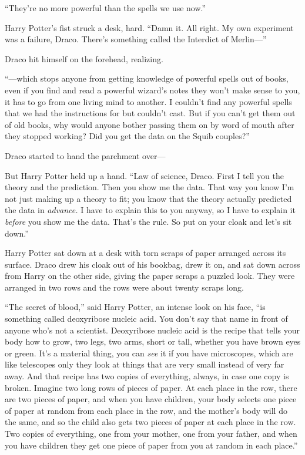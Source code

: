 ``They're no more powerful than the spells we use now.''

Harry Potter's fist struck a desk, hard. ``Damn it. All right. My own
experiment was a failure, Draco. There's something called the Interdict
of Merlin---''

Draco hit himself on the forehead, realizing.

``---which stops anyone from getting knowledge of powerful spells out of
books, even if you find and read a powerful wizard's notes they won't
make sense to you, it has to go from one living mind to another. I
couldn't find any powerful spells that we had the instructions for but
couldn't cast. But if you can't get them out of old books, why would
anyone bother passing them on by word of mouth after they stopped
working? Did you get the data on the Squib couples?''

Draco started to hand the parchment over---

But Harry Potter held up a hand. ``Law of science, Draco. First I tell
you the theory and the prediction. Then you show me the data. That way
you know I'm not just making up a theory to fit; you know that the
theory actually predicted the data in \emph{advance.} I have to explain
this to you anyway, so I have to explain it \emph{before} you show me
the data. That's the rule. So put on your cloak and let's sit down.''

Harry Potter sat down at a desk with torn scraps of paper arranged
across its surface. Draco drew his cloak out of his bookbag, drew it on,
and sat down across from Harry on the other side, giving the paper
scraps a puzzled look. They were arranged in two rows and the rows were
about twenty scraps long.

``The secret of blood,'' said Harry Potter, an intense look on his face,
``is something called deoxyribose nucleic acid. You don't say that name
in front of anyone who's not a scientist. Deoxyribose nucleic acid is
the recipe that tells your body how to grow, two legs, two arms, short
or tall, whether you have brown eyes or green. It's a material thing,
you can \emph{see} it if you have microscopes, which are like telescopes
only they look at things that are very small instead of very far away.
And that recipe has two copies of everything, always, in case one copy
is broken. Imagine two long rows of pieces of paper. At each place in
the row, there are two pieces of paper, and when you have children, your
body selects one piece of paper at random from each place in the row,
and the mother's body will do the same, and so the child also gets two
pieces of paper at each place in the row. Two copies of everything, one
from your mother, one from your father, and when you have children they
get one piece of paper from you at random in each place.''

